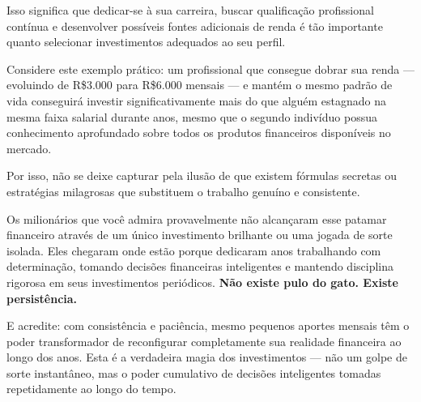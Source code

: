 \vspace{0.8cm}
\noindent Isso significa que dedicar-se à sua carreira, buscar qualificação profissional contínua e desenvolver possíveis fontes adicionais de renda é tão importante quanto selecionar investimentos adequados ao seu perfil.

\vspace{0.5cm}
\noindent Considere este exemplo prático: um profissional que consegue dobrar sua renda — evoluindo de R\$3.000 para R\$6.000 mensais — e mantém o mesmo padrão de vida conseguirá investir significativamente mais do que alguém estagnado na mesma faixa salarial durante anos, mesmo que o segundo indivíduo possua conhecimento aprofundado sobre todos os produtos financeiros disponíveis no mercado.

\vspace{0.5cm}
\noindent Por isso, não se deixe capturar pela ilusão de que existem fórmulas secretas ou estratégias milagrosas que substituem o trabalho genuíno e consistente.

\vspace{0.5cm}
\noindent Os milionários que você admira provavelmente não alcançaram esse patamar financeiro através de um único investimento brilhante ou uma jogada de sorte isolada. Eles chegaram onde estão porque dedicaram anos trabalhando com determinação, tomando decisões financeiras inteligentes e mantendo disciplina rigorosa em seus investimentos periódicos. \textbf{Não existe pulo do gato. Existe persistência.}

\vspace{0.5cm}
\noindent E acredite: com consistência e paciência, mesmo pequenos aportes mensais têm o poder transformador de reconfigurar completamente sua realidade financeira ao longo dos anos. Esta é a verdadeira magia dos investimentos — não um golpe de sorte instantâneo, mas o poder cumulativo de decisões inteligentes tomadas repetidamente ao longo do tempo.
